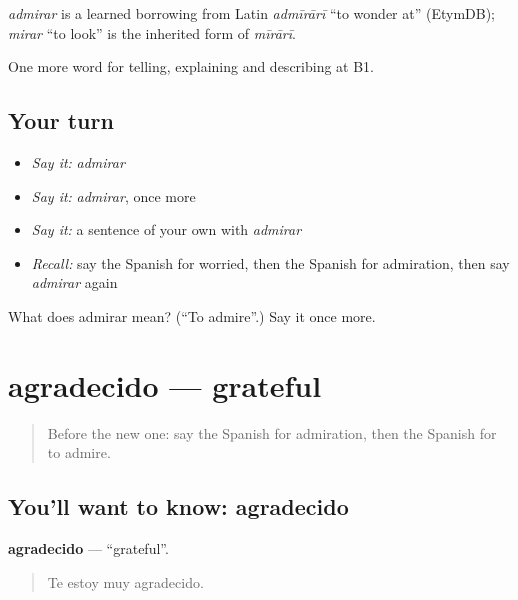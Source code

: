 \begin{cousinweb}
\emph{admirar} is a learned borrowing from Latin \emph{admīrārī} \textquotedblleft{}to wonder at\textquotedblright{} (EtymDB); \emph{mirar} \textquotedblleft{}to look\textquotedblright{} is the inherited form of \emph{mīrārī}.
\end{cousinweb}

\begin{grammarlens}[title={What you've built}]
One more word for telling, explaining and describing at B1.
\end{grammarlens}

\subsection*{Your turn}
\begin{itemize}
\raggedright
  \item \emph{Say it:} \emph{admirar}
  \item \emph{Say it:} \emph{admirar}, once more
  \item \emph{Say it:} a sentence of your own with \emph{admirar}
  \item \emph{Recall:} say the Spanish for worried, then the Spanish for admiration, then say \emph{admirar} again
\end{itemize}

\begin{tcolorbox}[breakable,colback=teal!4,colframe=teal!35!black,title={Before you move on}]
What does admirar mean? (\textquotedblleft{}To admire\textquotedblright{}.) Say it once more.
\end{tcolorbox}
\section[agradecido]{agradecido — grateful}

\label{lesson:ES-C720-agradecido}



\begin{quote}
Before the new one: say the Spanish for admiration, then the Spanish for to admire.
\end{quote}

\subsection*{You'll want to know: agradecido}
\textbf{agradecido} — \textquotedblleft{}grateful\textquotedblright{}.

\begin{quote}
Te estoy muy agradecido.
\end{quote}

